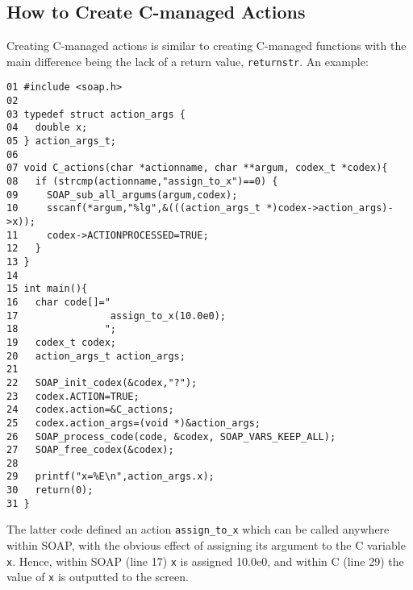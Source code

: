 \documentclass{warpdoc}
\begin{document}
\subsection{How to Create C-managed Actions}

Creating C-managed actions is similar to creating C-managed functions
with the main difference being the lack of a return value, \verb|returnstr|.
An example:
%
\begin{verbatim}
01 #include <soap.h>
02
03 typedef struct action_args {
04   double x;
05 } action_args_t;
06
07 void C_actions(char *actionname, char **argum, codex_t *codex){
08   if (strcmp(actionname,"assign_to_x")==0) {
09     SOAP_sub_all_argums(argum,codex);
10     sscanf(*argum,"%lg",&(((action_args_t *)codex->action_args)->x));
11     codex->ACTIONPROCESSED=TRUE;
12   }
13 }
14
15 int main(){
16   char code[]="
17                assign_to_x(10.0e0);
18               ";
19   codex_t codex;
20   action_args_t action_args;
21
22   SOAP_init_codex(&codex,"?");
23   codex.ACTION=TRUE;
24   codex.action=&C_actions;
25   codex.action_args=(void *)&action_args;
26   SOAP_process_code(code, &codex, SOAP_VARS_KEEP_ALL);
27   SOAP_free_codex(&codex);
28
29   printf("x=%E\n",action_args.x);
30   return(0);
31 }
\end{verbatim}
%
The latter code defined an action \verb|assign_to_x| which can be
called anywhere within SOAP, with the obvious effect of assigning its argument
to the C variable \verb|x|. Hence, within SOAP (line 17) \verb|x| is assigned 10.0e0,
and within C (line 29) the value of \verb|x| is outputted to the screen.




  
  
\end{document}
